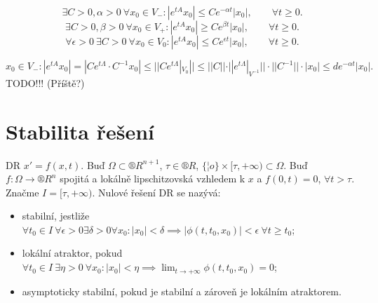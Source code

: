 \documentclass[12pt]{article}					%
\begin{document}
\begin{veta}
	$$ \exists C > 0, \alpha > 0\ \forall x_0 \in V_-: |e^{tA} x_0| ≤ C e^{-\alpha t}|x_0|, \qquad \forall t ≥ 0. $$
	$$ \exists C > 0, \beta > 0\ \forall x_0 \in V_+: |e^{tA} x_0| ≥ C e^{\beta t}|x_0|, \qquad \forall t ≥ 0. $$
	$$ \forall \epsilon > 0\ \exists C > 0\ \forall x_0 \in V_0: |e^{tA} x_0| ≤ C e^{\epsilon t}|x_0|, \qquad \forall t ≥ 0. $$

	\begin{dukazin}
		$$ x_0 \in V_-: |e^{tA} x_0| = |C e^{t \Lambda} · C^{-1} x_0| ≤ ||C e^{t \Lambda}|_{V_0}|| ≤ ||C|| · ||e^{t \Lambda}|_{V^{-1}}||·||C^{-1}||·|x_0| ≤ d e^{-\alpha t} |x_0|. $$
		TODO!!! (Příště?)
	\end{dukazin}
\end{veta}

\section{Stabilita řešení}
\begin{definice}
	DR $x' = f(x, t)$. Buď $\Omega \subset ®R^{n+1}$, $\tau \in ®R$, $\{¦o\} \times [\tau, +∞) \subset \Omega$. Buď $f: \Omega \rightarrow ®R^n$ spojitá a lokálně lipschitzovská vzhledem k $x$ a $f(0, t) = 0$, $\forall t > \tau$. Značme $I = [\tau, +∞)$. Nulové řešení DR se nazývá:

	\begin{itemize}
		\item stabilní, jestliže $\forall t_0 \in I\ \forall \epsilon > 0 \exists \delta > 0 \forall x_0: |x_0| < \delta \implies |\phi(t, t_0, x_0)| < \epsilon\ \forall t ≥ t_0$;
		\item lokální atraktor, pokud $\forall t_0 \in I\ \exists \eta > 0\ \forall x_0: |x_0| < \eta \implies \lim_{t \rightarrow +∞} \phi(t, t_0, x_0) = 0$;
		\item asymptoticky stabilní, pokud je stabilní a zároveň je lokálním atraktorem.
	\end{itemize}
\end{definice}
\end{document}
